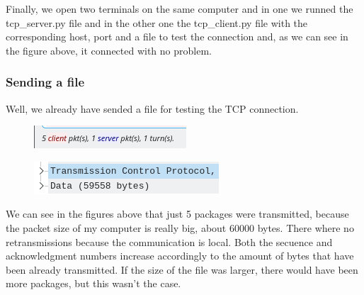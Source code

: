 Finally, we open two terminals on the same computer and in one we runned the tcp\_server.py file and in the other one the tcp\_client.py file with the corresponding host, port and a file to test the connection and, as we can see in the figure above, it connected with no problem.

\subsubsection{Sending a file}

Well, we already have sended a file for testing the TCP connection.

\begin{figure}[htbp]
	\centering
	\includegraphics[width=1\linewidth]{img/sixth_experience/4.png}
	\caption{}\label{fig:4_1}
\end{figure}

\begin{figure}[htbp]
	\centering
	\includegraphics[width=1\linewidth]{img/sixth_experience/5.png}
	\caption{}\label{fig:4_1}
\end{figure}

We can see in the figures above that just 5 packages were transmitted, because the packet size of my computer is really big, about 60000 bytes.
There where no retransmissions because the communication is local. Both the secuence and acknowledgment numbers increase accordingly to the amount of bytes that have been already transmitted. If the size of the file was larger, there would have been more packages, but this wasn't the case.

